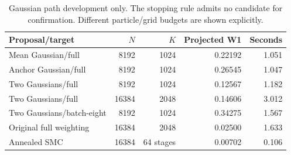 \begin{table}[h]
\centering\small
\caption{Gaussian path development only. The stopping rule admits no candidate for confirmation. Different particle/grid budgets are shown explicitly.}
\begin{tabular}{lrrrr}
\toprule
Proposal/target & $N$ & $K$ & Projected W1 & Seconds\\
\midrule
Mean Gaussian/full & 8192 & 1024 & 0.22192 & 1.051\\
Anchor Gaussian/full & 8192 & 1024 & 0.26545 & 1.047\\
Two Gaussians/full & 8192 & 1024 & 0.12567 & 1.182\\
Two Gaussians/full & 16384 & 2048 & 0.14606 & 3.012\\
Two Gaussians/batch-eight & 8192 & 1024 & 0.34275 & 1.567\\
Original full weighting & 16384 & 2048 & 0.02500 & 1.633\\
Annealed SMC & 16384 & 64 stages & 0.00702 & 0.106\\
\bottomrule
\end{tabular}
\end{table}
